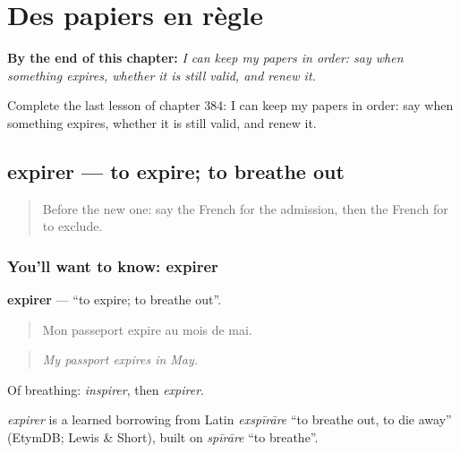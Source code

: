 
\chapter{Des papiers en règle}
\label{ch:fr-des-papiers-en-regle}

\begin{chapteropening}
\textbf{By the end of this chapter:} \emph{I can keep my papers in order: say when something expires, whether it is still valid, and renew it.}

Complete the last lesson of chapter 384: I can keep my papers in order: say when something expires, whether it is still valid, and renew it.
\end{chapteropening}

\section[expirer]{expirer — to expire; to breathe out}

\label{lesson:FR-C384-expirer}



\begin{quote}
Before the new one: say the French for the admission, then the French for to exclude.
\end{quote}

\subsection*{You'll want to know: expirer}
\textbf{expirer} — \textquotedblleft{}to expire; to breathe out\textquotedblright{}.

\begin{quote}
Mon passeport expire au mois de mai.
\end{quote}

\begin{quote}
\emph{My passport expires in May.}
\end{quote}

Of breathing: \emph{inspirer}, then \emph{expirer}.

\begin{cousinweb}
\emph{expirer} is a learned borrowing from Latin \emph{exspīrāre} \textquotedblleft{}to breathe out, to die away\textquotedblright{} (EtymDB; Lewis \& Short), built on \emph{spīrāre} \textquotedblleft{}to breathe\textquotedblright{}.
\end{cousinweb}

